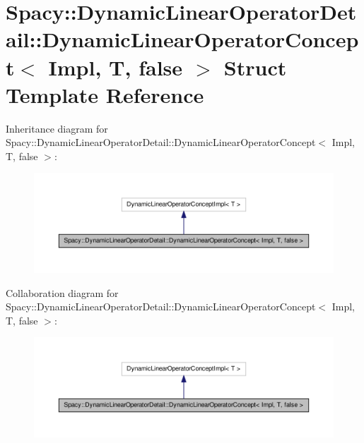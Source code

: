 \hypertarget{structSpacy_1_1DynamicLinearOperatorDetail_1_1DynamicLinearOperatorConcept_3_01Impl_00_01T_00_01false_01_4}{\section{\-Spacy\-:\-:\-Dynamic\-Linear\-Operator\-Detail\-:\-:\-Dynamic\-Linear\-Operator\-Concept$<$ \-Impl, \-T, false $>$ \-Struct \-Template \-Reference}
\label{structSpacy_1_1DynamicLinearOperatorDetail_1_1DynamicLinearOperatorConcept_3_01Impl_00_01T_00_01false_01_4}
}


\-Inheritance diagram for \-Spacy\-:\-:\-Dynamic\-Linear\-Operator\-Detail\-:\-:\-Dynamic\-Linear\-Operator\-Concept$<$ \-Impl, \-T, false $>$\-:
\nopagebreak
\begin{figure}[H]
\begin{center}
\leavevmode
\includegraphics[width=350pt]{structSpacy_1_1DynamicLinearOperatorDetail_1_1DynamicLinearOperatorConcept_3_01Impl_00_01T_00_01false_01_4__inherit__graph}
\end{center}
\end{figure}


\-Collaboration diagram for \-Spacy\-:\-:\-Dynamic\-Linear\-Operator\-Detail\-:\-:\-Dynamic\-Linear\-Operator\-Concept$<$ \-Impl, \-T, false $>$\-:
\nopagebreak
\begin{figure}[H]
\begin{center}
\leavevmode
\includegraphics[width=350pt]{structSpacy_1_1DynamicLinearOperatorDetail_1_1DynamicLinearOperatorConcept_3_01Impl_00_01T_00_01false_01_4__coll__graph}
\end{center}
\end{figure}
